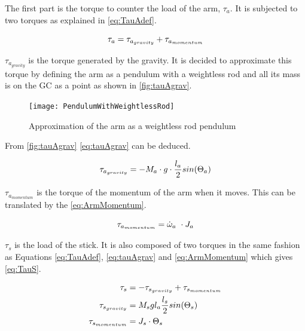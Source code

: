 The first part is the torque to counter the load of the arm, $\tau_a$. It is subjected to two torques as explained in \autoref{eq:TauAdef}.

\begin{equation}\label{eq:TauAdef}
	\tau_a=\tau_{a_{gravity}}+\tau_{a_{momentum}} \addunit{\newton\meter}
\end{equation}

 $\tau_{a_{gravity}}$ is the torque generated by the gravity. It is decided to approximate this torque by defining the arm as a pendulum with a weightless rod and all its mass is on the GC as a point as shown in \autoref{fig:tauAgrav}.
 
 \begin{figure}[htbp]
 	\centering
 	\texttt{[image: PendulumWithWeightlessRod]}
 	\caption{Approximation of the arm as a weightless rod pendulum}\label{fig:tauAgrav}
 \end{figure}
 
 From \autoref{fig:tauAgrav} \autoref{eq:tauAgrav} can be deduced.

\begin{equation}\label{eq:tauAgrav}
	\tau_{a_{gravity}}=-M_a\cdot g \cdot \frac{l_a}{2} sin(\Theta_a) \addunit{\newton\meter}
\end{equation}
\startexplain
{}
\stopexplain

$\tau_{a_{momentum}}$ is the torque of the momentum of the arm when it moves. This can be translated by the \autoref{eq:ArmMomentum}.

\begin{equation}\label{eq:ArmMomentum}
	\tau_{a_{momentum}}=\dot\omega_a\ \cdot J_a \addunit{\newton\meter}
\end{equation}
\startexplain
{}
\stopexplain

$\tau_s$ is the load of the stick. It is also composed of two torques in the same fashion as Equations \eqref{eq:TauAdef}, \eqref{eq:tauAgrav} and \eqref{eq:ArmMomentum} which gives \autoref{eq:TauS}.

\begin{subequations}\label{eq:TauS}
	\begin{flalign}
		\tau_s&=-\tau_{s_{gravity}}+\tau_{s_{momentum}} \addunit{\newton\meter}\\
		\tau_{s_{gravity}}&=M_s g l_a\frac{l_s}{2} sin(\Theta_s) \addunit{\newton\meter}\\
		\tau_{s_{momentum}}&=J_s\cdot \Theta_s\addunit{\newton\meter}\label{eq:TausMomentum}
	\end{flalign}
\end{subequations}

